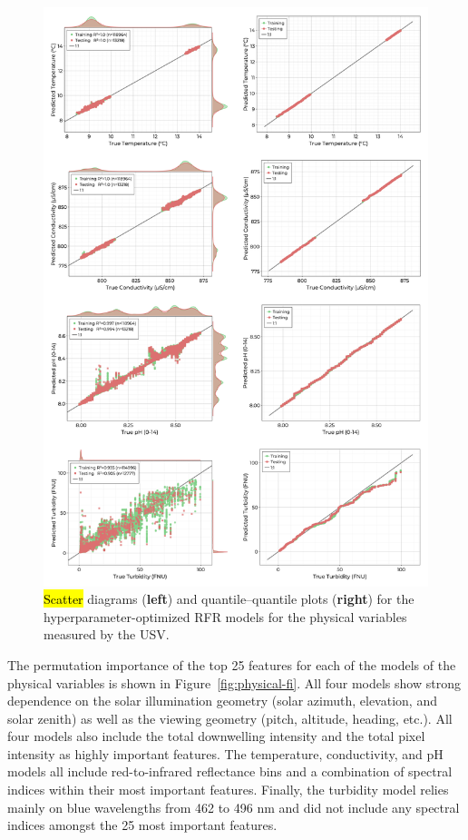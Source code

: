 \documentclass[remotesensing,article,accept,pdftex,moreauthors]{Definitions/mdpi}
\begin{document}
\begin{figure}[H]
\vspace{-0.15in}
\includegraphics[width=0.9\columnwidth]{figures/results/fits/physical-fitres.png}
\vspace{-0.1in}
\caption{\hl{Scatter} %
 diagrams (\textbf{left}) and quantile--quantile plots (\textbf{right}) for the hyperparameter-optimized RFR models for the physical variables measured by the USV.\label{fig:physical-fit}}
\end{figure}  

The permutation importance of the top 25 features for each of the models of the physical variables is shown in Figure~\ref{fig:physical-fi}. All four models show strong dependence on the solar illumination geometry (solar azimuth, elevation, and solar zenith) as well as the viewing geometry (pitch, altitude, heading, etc.). All four models also include the total downwelling intensity and the total pixel intensity as highly important features. The temperature, conductivity, and pH models all include red-to-infrared reflectance bins and a combination of spectral indices within their most important features. Finally, the turbidity model relies mainly on blue wavelengths from 462 to 496 nm and did not include any spectral indices amongst the 25 most important features.
\end{document}
